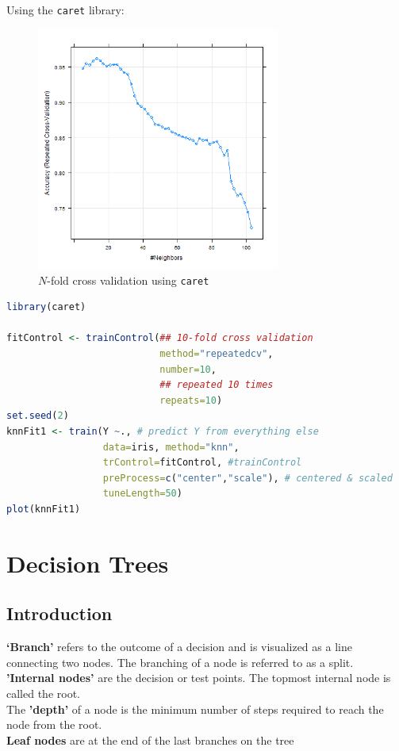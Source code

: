 \documentclass{article}
\begin{document}
Using the \texttt{caret} library:
\begin{figure}[H]
    \centering
    \includegraphics[width=8cm]{images/ncv_caret.png}
    \caption{$N$-fold cross validation using \texttt{caret}}
\end{figure}
\begin{lstlisting}[language=R]
library(caret)

fitControl <- trainControl(## 10-fold cross validation
                           method="repeatedcv",
                           number=10,
                           ## repeated 10 times
                           repeats=10)
set.seed(2)
knnFit1 <- train(Y ~., # predict Y from everything else
                 data=iris, method="knn",
                 trControl=fitControl, #trainControl
                 preProcess=c("center","scale"), # centered & scaled
                 tuneLength=50)
plot(knnFit1)
\end{lstlisting}

\section{Decision Trees}
\subsection{Introduction}
\textbf{‘Branch’} refers to the outcome of a decision and is visualized
as a line connecting two nodes. The branching of a node is referred to as a split.\\
\textbf{'Internal nodes'} are the decision or test points. The topmost internal node is called the root. \\The \textbf{'depth'} of a node is the minimum number of steps required to reach the node from the root. \\\textbf{Leaf nodes} are at the end of the last branches on the tree
\end{document}
